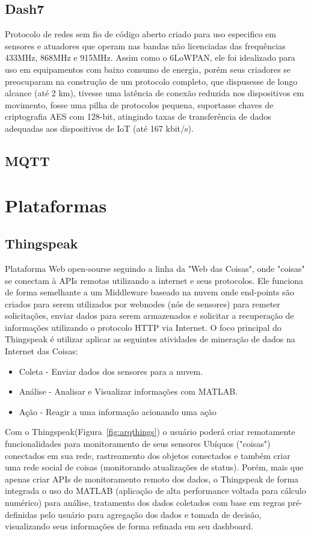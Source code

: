 \subsection{Dash7}
Protocolo de redes sem fio de c\'odigo aberto criado para uso especifico em sensores e atuadores que operam nas bandas n\~ao licenciadas das frequ\^encias 433MHz, 868MHz e 915MHz. Assim como o 6LoWPAN, ele foi idealizado para uso em equipamentos com baixo consumo de energia, por\'em seus criadores se preocuparam na constru\c{c}\~ao de um protocolo completo, que dispusesse de longo alcance (at\'e 2 km), tivesse uma lat\^encia de conex\~ao reduzida nos dispositivos em movimento, fosse uma pilha de protocolos pequena, suportasse chaves de criptografia AES com 128-bit, atingindo taxas de transfer\^encia de dados adequadas aos dispositivos de IoT (at\'e  167 kbit/s).
\subsection{MQTT}

\section{Plataformas}
\subsection{Thingspeak}
	Plataforma Web open-sourse seguindo a linha da "Web das Coisas", onde "coisas" se conectam \`a APIs remotas utilizando a internet e seus protocolos. Ele funciona de forma semelhante a um Middleware baseado na nuvem onde end-points s\~ao criados para serem utilizados por webnodes (n\'os de sensores) para remeter solicita\c{c}\~oes, enviar dados para serem armazenados e solicitar a recupera\c{c}\~ao de informa\c{c}\~oes utilizando o protocolo HTTP via Internet. O foco principal do Thingspeak \'e utilizar aplicar as seguintes atividades de minera\c{c}\~ao de dados na Internet das Coisas:
	
	\begin{itemize}
		\item Coleta - Enviar dados dos sensores para a nuvem.
		\item An\'alise - Analisar e Visualizar informa\c{c}\~oes com MATLAB.
		\item A\c{c}\~ao - Reagir a uma informa\c{c}\~ao acionando uma a\c{c}\~ao
	\end{itemize}
	
	Com o Thingspeak(Figura~\ref{fig:arqthings}) o usu\'ario poder\'a criar remotamente funcionalidades para monitoramento de seus sensores Ub\'iquos ("coisas") conectados em sua rede, rastreamento dos objetos conectados e tamb\'em criar uma rede social de coisas (monitorando atualiza\c{c}\~oes de status). Por\'em, mais que apenas criar APIs de monitoramento remoto dos dados, o Thingspeak de forma integrada o uso do MATLAB (aplica\c{c}\~ao de alta performance voltada para c\'alculo num\'erico) para an\'alise, tratamento dos dados coletados com base em regras pr\'e-definidas pelo usu\'ario para agrega\c{c}\~ao dos dados e tomada de decis\~ao, visualizando seus informa\c{c}\~oes de forma refinada em seu dashboard.
	
